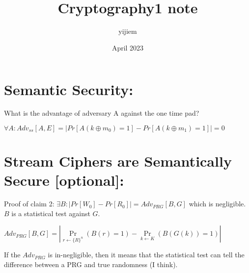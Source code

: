 \documentclass{article}
\title{Cryptography1 note}
\author{yijiem }
\date{April 2023}
\begin{document}
\maketitle

\section*{Semantic Security:}

What is the advantage of adversary A against the one time pad?

$\forall A:Adv_{ss}[A,E]=|Pr[A(k\oplus m_{0})=1]-Pr[A(k\oplus m_{1})=1]|=0$

\section*{Stream Ciphers are Semantically Secure [optional]:}

Proof of claim 2: $\exists B: |Pr[W_{0}]-Pr[R_{0}]|=Adv_{PRG}[B,G]$ which is negligible. $B$ is a statistical test against $G$.

$Adv_{PRG}[B,G]=|\Pr\limits_{r\gets \{R\}^n}(B(r)=1)-\Pr\limits_{k\gets K}(B(G(k))=1)|$

If the $Adv_{PRG}$ is in-negligible, then it means that the statistical test can tell the difference between a PRG and true randomness (I think).
\end{document}
